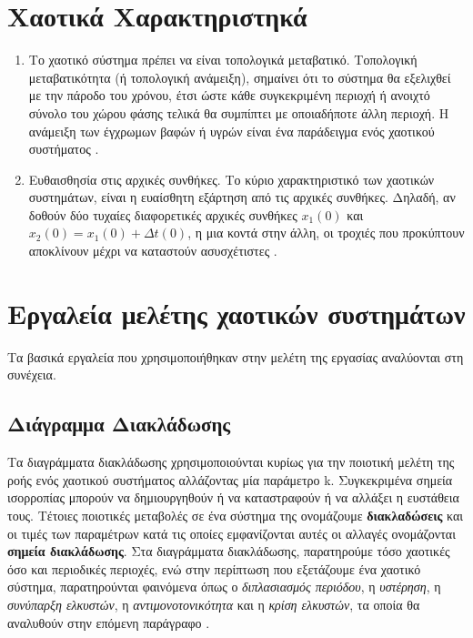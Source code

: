 \section{Χαοτικά Χαρακτηριστηκά}

\begin{enumerate}
	\item Το χαοτικό σύστημα πρέπει να είναι τοπολογικά μεταβατικό. 
	Τοπολογική μεταβατικότητα (ή τοπολογική ανάμειξη), σημαίνει ότι το
	σύστημα θα εξελιχθεί με την πάροδο του χρόνου, έτσι ώστε κάθε συγκεκριμένη
	περιοχή ή ανοιχτό σύνολο του χώρου φάσης τελικά θα συμπίπτει με οποιαδήποτε
	άλλη περιοχή. H ανάμειξη των έγχρωμων βαφών ή υγρών είναι ένα παράδειγμα ενός χαοτικού συστήματος \cite{b11}.
	\item Eυθαισθησία στις αρχικές συνθήκες.
	Το κύριο χαρακτηριστικό των χαοτικών συστημάτων, είναι η
	ευαίσθητη εξάρτηση από τις αρχικές συνθήκες. Δηλαδή, αν δοθούν δύο τυχαίες διαφορετικές αρχικές συνθήκες $x_1(0)$ και $x_2(0) = x_1(0) + Δt(0) $, η μια κοντά στην άλλη, οι τροχιές που προκύπτουν αποκλίνουν μέχρι να καταστούν ασυσχέτιστες \cite{b2}.
\end{enumerate}


\section{Εργαλεία μελέτης χαοτικών συστημάτων}
Τα βασικά εργαλεία που χρησιμοποιήθηκαν στην μελέτη της εργασίας αναλύονται στη συνέχεια.

\subsection{Διάγραμμα Διακλάδωσης}

Tα διαγράμματα διακλάδωσης χρησιμοποιούνται κυρίως για την ποιοτική μελέτη της ροής ενός χαοτικού συστήματος αλλάζοντας μία παράμετρο k. Συγκεκριμένα σημεία ισορροπίας μπορούν να δημιουργηθούν ή να καταστραφούν ή να αλλάξει η ευστάθεια τους. Τέτοιες ποιοτικές μεταβολές σε ένα σύστημα της ονομάζουμε \textbf{διακλαδώσεις} και οι τιμές των παραμέτρων κατά τις οποίες εμφανίζονται αυτές οι αλλαγές ονομάζονται \textbf{σημεία διακλάδωσης}. Στα διαγράμματα διακλάδωσης, παρατηρούμε τόσο χαοτικές όσο και περιοδικές περιοχές, ενώ στην περίπτωση που εξετάζουμε ένα χαοτικό σύστημα, παρατηρούνται φαινόμενα όπως ο \emph{διπλασιασμός περιόδου}, η \emph{υστέρηση}, η \emph{συνύπαρξη ελκυστών}, 
η \emph{αντιμονοτονικότητα} και η \emph{κρίση ελκυστών}, τα οποία θα αναλυθούν στην επόμενη παράγραφο \cite{b4}.

